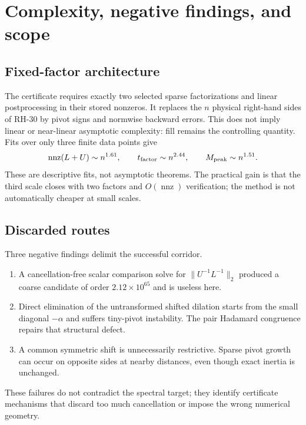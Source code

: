 \documentclass[11pt]{article}
\theoremstyle{definition}
\theoremstyle{remark}
\begin{document}
\section{Complexity, negative findings, and scope}
\label{sec:scope}

\subsection{Fixed-factor architecture}

The certificate requires exactly two selected sparse factorizations and
linear postprocessing in their stored nonzeros.  It replaces the $n$ physical
right-hand sides of RH-30 by pivot signs and normwise backward errors.
This does not imply linear or near-linear asymptotic complexity: fill remains
the controlling quantity.  Fits over only three finite data points give
\begin{equation}
 \operatorname{nnz}(L+U)\sim n^{1.61},\qquad
 t_{\rm factor}\sim n^{2.44},\qquad
 M_{\rm peak}\sim n^{1.51}.
 \label{eq:empirical-exponents}
\end{equation}
These are descriptive fits, not asymptotic theorems.  The practical gain is
that the third scale closes with two factors and $O(\operatorname{nnz})$
verification; the method is not automatically cheaper at small scales.

\subsection{Discarded routes}

Three negative findings delimit the successful corridor.
\begin{enumerate}
 \item A cancellation-free scalar comparison solve for
       $\|U^{-1}L^{-1}\|_2$ produced a coarse candidate of order
       $2.12\times10^{65}$ and is useless here.
 \item Direct elimination of the untransformed shifted dilation starts from
       the small diagonal $-\alpha$ and suffers tiny-pivot instability.  The
       pair Hadamard congruence repairs that structural defect.
 \item A common symmetric shift is unnecessarily restrictive.  Sparse pivot
       growth can occur on opposite sides at nearby distances, even though
       exact inertia is unchanged.
\end{enumerate}
These failures do not contradict the spectral target; they identify
certificate mechanisms that discard too much cancellation or impose the
wrong numerical geometry.
\end{document}
